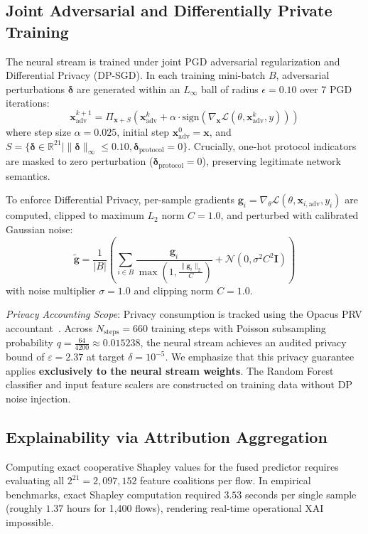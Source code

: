 \documentclass[10pt,journal,compsoc,twocolumn]{IEEEtran}
\begin{document}
\subsection{Joint Adversarial and Differentially Private Training}
The neural stream is trained under joint PGD adversarial regularization and Differential Privacy (DP-SGD). In each training mini-batch $B$, adversarial perturbations $\mathbf{\delta}$ are generated within an $L_\infty$ ball of radius $\epsilon = 0.10$ over 7 PGD iterations:
\begin{equation}
\mathbf{x}_{\text{adv}}^{k+1} = \Pi_{\mathbf{x} + S} \left( \mathbf{x}_{\text{adv}}^k + \alpha \cdot \text{sign}(\nabla_{\mathbf{x}} \mathcal{L}(\theta, \mathbf{x}_{\text{adv}}^k, y)) \right)
\end{equation}
where step size $\alpha = 0.025$, initial step $\mathbf{x}_{\text{adv}}^0 = \mathbf{x}$, and $S = \{ \mathbf{\delta} \in \mathbb{R}^{21} \mid \|\mathbf{\delta}\|_\infty \le 0.10, \mathbf{\delta}_{\text{protocol}} = 0 \}$. Crucially, one-hot protocol indicators are masked to zero perturbation ($\mathbf{\delta}_{\text{protocol}} = 0$), preserving legitimate network semantics.

To enforce Differential Privacy, per-sample gradients $\mathbf{g}_i = \nabla_\theta \mathcal{L}(\theta, \mathbf{x}_{i, \text{adv}}, y_i)$ are computed, clipped to maximum $L_2$ norm $C = 1.0$, and perturbed with calibrated Gaussian noise:
\begin{equation}
\tilde{\mathbf{g}} = \frac{1}{|B|} \left( \sum_{i \in B} \frac{\mathbf{g}_i}{\max\left(1, \frac{\|\mathbf{g}_i\|_2}{C}\right)} + \mathcal{N}(0, \sigma^2 C^2 \mathbf{I}) \right)
\end{equation}
with noise multiplier $\sigma = 1.0$ and clipping norm $C = 1.0$.

\textit{Privacy Accounting Scope}: Privacy consumption is tracked using the Opacus PRV accountant~\cite{mironov2017renyi}. Across $N_{\text{steps}} = 660$ training steps with Poisson subsampling probability $q = \frac{64}{4200} \approx 0.015238$, the neural stream achieves an audited privacy bound of $\varepsilon = 2.37$ at target $\delta = 10^{-5}$. We emphasize that this privacy guarantee applies \textbf{exclusively to the neural stream weights}. The Random Forest classifier and input feature scalers are constructed on training data without DP noise injection.

\subsection{Explainability via Attribution Aggregation}
Computing exact cooperative Shapley values for the fused predictor requires evaluating all $2^{21} = 2,097,152$ feature coalitions per flow. In empirical benchmarks, exact Shapley computation required $3.53$ seconds per single sample (roughly $1.37$ hours for 1,400 flows), rendering real-time operational XAI impossible. 
\end{document}
